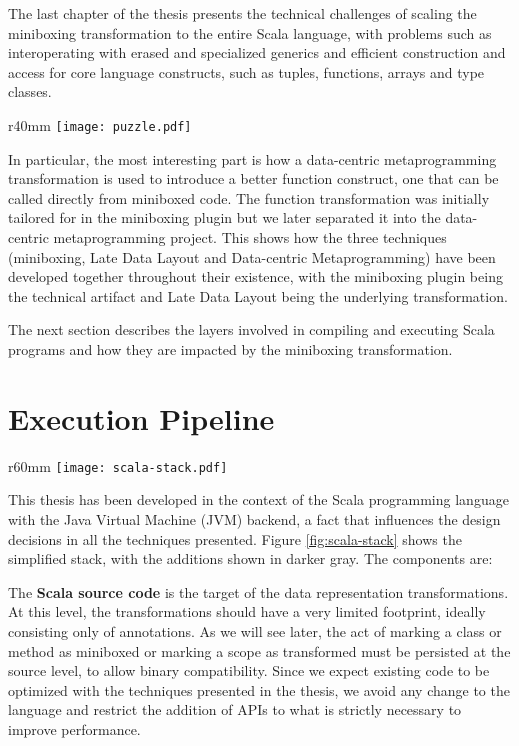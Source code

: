 The last chapter of the thesis presents the technical challenges of scaling the miniboxing transformation to the entire Scala language, with problems such as interoperating with erased and specialized generics and efficient construction and access for core language constructs, such as tuples, functions, arrays and type classes.

\begin{wrapfigure}{r}{40mm}
  \centering
  \vspace{-2.5em}
  \texttt{[image: puzzle.pdf]}
  \caption{Miniboxing Component Puzzle}
  \vspace{-2em}
\end{wrapfigure}

In particular, the most interesting part is how a data-centric metaprogramming transformation is used to introduce a better function construct, one that can be called directly from miniboxed code. The function transformation was initially tailored for in the miniboxing plugin but we later separated it into the data-centric metaprogramming project. This shows how the three techniques (miniboxing, Late Data Layout and Data-centric Metaprogramming) have been developed together throughout their existence, with the miniboxing plugin being the technical artifact and Late Data Layout being the underlying transformation.

The next section describes the layers involved in compiling and executing Scala programs and how they are impacted by the miniboxing transformation.

\section{Execution Pipeline}

\begin{wrapfigure}{r}{60mm}
  \centering
  \vspace{-2.5em}
  \texttt{[image: scala-stack.pdf]}
  \caption{Scala Stack}
  \label{fig:scala-stack}
  \vspace{-2em}
\end{wrapfigure}

This thesis has been developed in the context of the Scala programming language with the Java Virtual Machine (JVM) backend, a fact that influences the design decisions in all the techniques presented. Figure \ref{fig:scala-stack} shows the simplified stack, with the additions shown in darker gray. The components are:

The \textbf{Scala source code} is the target of the data representation transformations. At this level, the transformations should have a very limited footprint, ideally consisting only of annotations. As we will see later, the act of marking a class or method as miniboxed or marking a scope as transformed must be persisted at the source level, to allow binary compatibility. Since we expect existing code to be optimized with the techniques presented in the thesis, we avoid any change to the language and restrict the addition of APIs to what is strictly necessary to improve performance.

